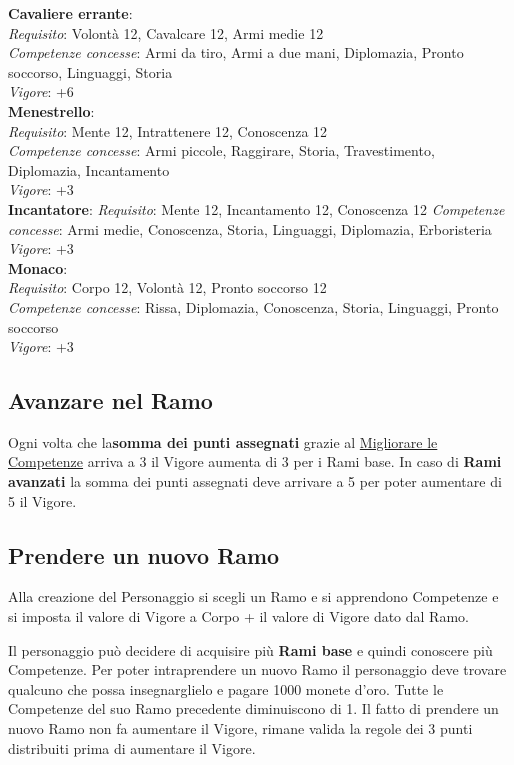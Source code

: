 \documentclass[12pt,a4paper,twoside,openany]{book}
\begin{document}
\begin{multicols}{2}
\textbf{Cavaliere errante}:\\
\textit{Requisito}: Volontà 12, Cavalcare 12, Armi medie 12\\
\textit{Competenze concesse}: Armi da tiro, Armi a due mani, Diplomazia, Pronto soccorso, Linguaggi, Storia\\
\textit{Vigore}: +6\\

\textbf{Menestrello}:\\
\textit{Requisito}: Mente 12, Intrattenere 12, Conoscenza 12\\
\textit{Competenze concesse}: Armi piccole, Raggirare, Storia, Travestimento, Diplomazia, Incantamento\\
\textit{Vigore}: +3\\

\textbf{Incantatore}:
\textit{Requisito}: Mente 12, Incantamento 12, Conoscenza 12
\textit{Competenze concesse}: Armi medie, Conoscenza, Storia, Linguaggi, Diplomazia, Erboristeria 
\textit{Vigore}: +3\\

\textbf{Monaco}:\\
\textit{Requisito}: Corpo 12, Volontà 12, Pronto soccorso 12\\
\textit{Competenze concesse}: Rissa, Diplomazia, Conoscenza, Storia, Linguaggi, Pronto soccorso\\
\textit{Vigore}: +3\\


\subsection{Avanzare nel Ramo}

Ogni volta che la\textbf{somma dei punti assegnati} grazie al \hyperlink{Migliorare le Competenze}{Migliorare le Competenze} arriva a 3 il Vigore aumenta di 3 per i Rami base.
In caso di \textbf{Rami avanzati} la somma dei punti assegnati deve arrivare a 5 per poter aumentare di 5 il Vigore.

\subsection{Prendere un nuovo Ramo}

Alla creazione del Personaggio si scegli un Ramo e si apprendono Competenze e si imposta il valore di Vigore a Corpo + il valore di Vigore dato dal Ramo.

Il personaggio può decidere di acquisire più \textbf{Rami base} e quindi conoscere più Competenze. Per poter intraprendere un nuovo Ramo il personaggio deve trovare qualcuno che possa insegnarglielo e pagare 1000 monete d'oro. Tutte le Competenze del suo Ramo precedente diminuiscono di 1.
Il fatto di prendere un nuovo Ramo non fa aumentare il Vigore, rimane valida la regole dei 3 punti distribuiti prima di aumentare il Vigore.


\end{multicols}
\end{document}
